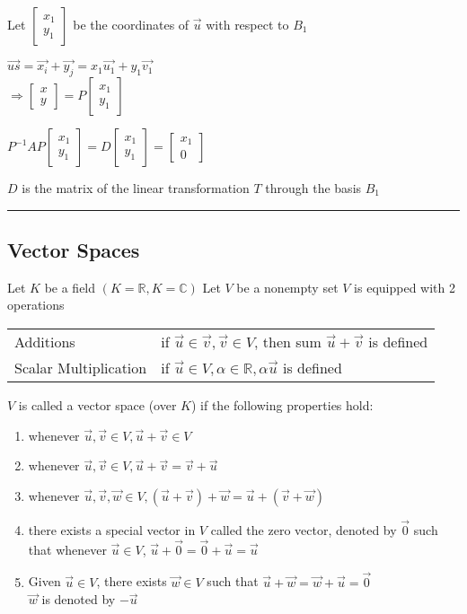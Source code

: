 \documentclass[12pt]{article}
\renewcommand{\v}[1]{\overrightarrow{#1}}
\newcommand\m[1]{\begin{bmatrix}#1\end{bmatrix}}
\newcommand{\real}[0]{\mathbb{R}}
\newcommand{\complex}[0]{\mathbb{C}}
\newcommand{\pp}[1]{\left(#1\right)}
\newcommand{\divider}[0]{\textcolor{lightgray}{\rule{\textwidth}{0.1pt}}}
\begin{document}
Let \(\m{x_1 \\ y_1}\) be the coordinates of \(\v{u}\) with respect to \(B_1\)

\(\v{us} = \v{x_i} + \v{y_j} = x_1 \v{u_1} + y_1 \v{v_1}\) \\
\(\Rightarrow \m{x \\ y} = P \m{x_1 \\ y_1}\)

\(P^{-1}AP \m{x_1 \\ y_1} = D \m{x_1 \\ y_1} = \m{x_1 \\ 0}\)

\(D\) is the matrix of the linear transformation \(T\) through the basis \(B_1\)

\divider

\subsection{Vector Spaces}

Let \(K\) be a field \(\pp{K = \real, K = \complex}\)
Let \(V\) be a nonempty set
\(V\) is equipped with 2 operations

\begin{tabular}{@{} l l}
	Additions	& if \(\v{u} \in \v{v}, \v{v} \in V\), then sum \(\v{u} + \v{v}\) is defined \\
	Scalar Multiplication & if \(\v{u} \in V, \alpha \in \real, \alpha \v{u}\) is defined
\end{tabular}

\(V\) is called a vector space (over \(K\)) if the following properties hold:

\begin{enumerate}[label=\(A_{\arabic*}\)]
	\item whenever \(\v{u}, \v{v} \in V, \v{u} + \v{v} \in V\)
	\item whenever \(\v{u}, \v{v} \in V, \v{u} + \v{v} = \v{v} + \v{u}\)
	\item whenever \(\v{u}, \v{v}, \v{w} \in V, \pp{\v{u} + \v{v}} + \v{w} = \v{u} + \pp{\v{v} + \v{w}}\)
	\item there exists a special vector in \(V\) called the zero vector, denoted by \(\v{0}\) such that whenever \(\v{u} \in V\), \(\v{u} + \v{0} = \v{0} + \v{u} = \v{u}\)
	\item Given \(\v{u} \in V\), there exists \(\v{w} \in V\) such that \(\v{u} + \v{w} = \v{w} + \v{u} = \v{0}\) \\
	\(\v{w}\) is denoted by \(-\v{u}\)
\end{enumerate}
\end{document}
